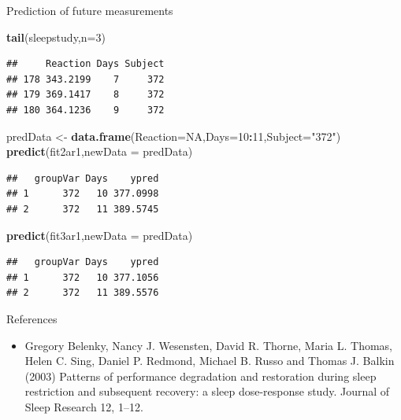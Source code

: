 \documentclass[
  ignorenonframetext,
]{beamer}
\newenvironment{Shaded}{\begin{snugshade}}{\end{snugshade}}
\newcommand{\DataTypeTok}[1]{\textcolor[rgb]{0.13,0.29,0.53}{#1}}
\newcommand{\DecValTok}[1]{\textcolor[rgb]{0.00,0.00,0.81}{#1}}
\newcommand{\KeywordTok}[1]{\textcolor[rgb]{0.13,0.29,0.53}{\textbf{#1}}}
\newcommand{\NormalTok}[1]{#1}
\newcommand{\OperatorTok}[1]{\textcolor[rgb]{0.81,0.36,0.00}{\textbf{#1}}}
\newcommand{\OtherTok}[1]{\textcolor[rgb]{0.56,0.35,0.01}{#1}}
\newcommand{\StringTok}[1]{\textcolor[rgb]{0.31,0.60,0.02}{#1}}
\providecommand{\tightlist}{%
  \setlength{\itemsep}{0pt}\setlength{\parskip}{0pt}}
\begin{document}
\begin{frame}[fragile]{Prediction of future measurements}
\protect\hypertarget{prediction-of-future-measurements}{}

\scriptsize

\begin{Shaded}
\begin{Highlighting}[]
\KeywordTok{tail}\NormalTok{(sleepstudy,}\DataTypeTok{n=}\DecValTok{3}\NormalTok{)}
\end{Highlighting}
\end{Shaded}

\begin{verbatim}
##     Reaction Days Subject
## 178 343.2199    7     372
## 179 369.1417    8     372
## 180 364.1236    9     372
\end{verbatim}

\begin{Shaded}
\begin{Highlighting}[]
\NormalTok{predData <-}\StringTok{ }\KeywordTok{data.frame}\NormalTok{(}\DataTypeTok{Reaction=}\OtherTok{NA}\NormalTok{,}\DataTypeTok{Days=}\DecValTok{10}\OperatorTok{:}\DecValTok{11}\NormalTok{,}\DataTypeTok{Subject=}\StringTok{"372"}\NormalTok{)}
\KeywordTok{predict}\NormalTok{(fit2ar1,}\DataTypeTok{newData =}\NormalTok{ predData)}
\end{Highlighting}
\end{Shaded}

\begin{verbatim}
##   groupVar Days    ypred
## 1      372   10 377.0998
## 2      372   11 389.5745
\end{verbatim}

\begin{Shaded}
\begin{Highlighting}[]
\KeywordTok{predict}\NormalTok{(fit3ar1,}\DataTypeTok{newData =}\NormalTok{ predData)}
\end{Highlighting}
\end{Shaded}

\begin{verbatim}
##   groupVar Days    ypred
## 1      372   10 377.1056
## 2      372   11 389.5576
\end{verbatim}

\end{frame}

\begin{frame}{References}
\protect\hypertarget{references}{}

\begin{itemize}
\tightlist
\item
  Gregory Belenky, Nancy J. Wesensten, David R. Thorne, Maria L. Thomas,
  Helen C. Sing, Daniel P. Redmond, Michael B. Russo and Thomas J.
  Balkin (2003) Patterns of performance degradation and restoration
  during sleep restriction and subsequent recovery: a sleep
  dose-response study. Journal of Sleep Research 12, 1--12.
\end{itemize}

\end{frame}
\end{document}
